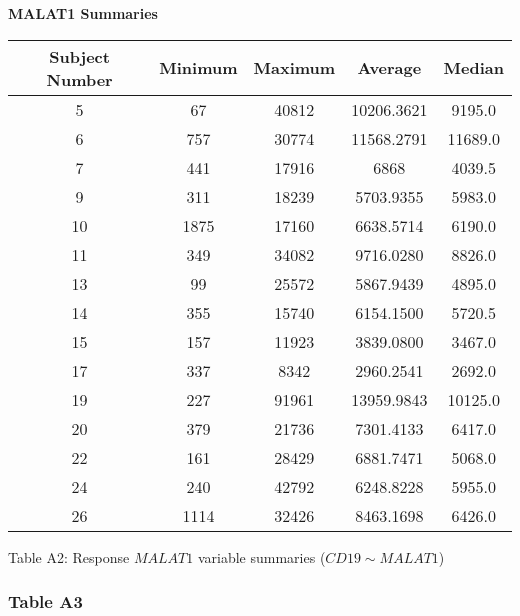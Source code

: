 \documentclass[12pt,]{article}
\begin{document}
\begin{center}

\textbf{\large{MALAT1 Summaries}}

\begin{tabular}{|c|c|c|c|c|}
\hline 
Subject Number & Minimum & Maximum & Average & Median \\ 
\hline
\hline
5  & 67 & 40812 & 10206.3621 & 9195.0 \\ 
\hline 
6  & 757 & 30774 & 11568.2791 & 11689.0 \\ 
\hline 
7  & 441 & 17916 & 6868 & 4039.5 \\ 
\hline 
9  & 311 & 18239 & 5703.9355 & 5983.0 \\ 
\hline 
10 & 1875 & 17160 & 6638.5714 & 6190.0 \\ 
\hline
11 & 349 & 34082 & 9716.0280 & 8826.0 \\ 
\hline 
13 & 99 & 25572 & 5867.9439 & 4895.0 \\ 
\hline 
14 & 355 & 15740 & 6154.1500 & 5720.5 \\ 
\hline 
15 & 157 & 11923 & 3839.0800 & 3467.0 \\ 
\hline 
17 & 337 & 8342 & 2960.2541 & 2692.0 \\ 
\hline 
19 & 227 & 91961 & 13959.9843 & 10125.0 \\ 
\hline 
20 & 379 & 21736 & 7301.4133 & 6417.0 \\ 
\hline 
22 & 161 & 28429 & 6881.7471 & 5068.0 \\ 
\hline 
24 & 240 & 42792 & 6248.8228 & 5955.0 \\ 
\hline 
26 & 1114 & 32426 & 8463.1698 & 6426.0 \\ 
\hline  
\end{tabular}

\vspace{5pt}

Table A2: Response $MALAT1$ variable summaries ($CD19 \sim MALAT1$)

\end{center}

\newpage

\hypertarget{table-a3}{%
\subsubsection{Table A3}\label{table-a3}}
\end{document}
